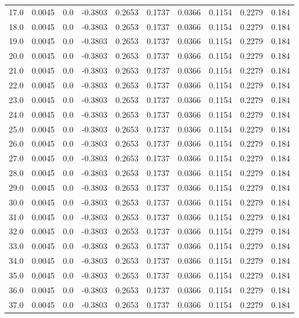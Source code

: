 \begin{longtable}{lrrrrrrrrr}
17.0 & 0.0045 & 0.0 & -0.3803 & 0.2653 & 0.1737 & 0.0366 & 0.1154 & 0.2279 & 0.184 \\
18.0 & 0.0045 & 0.0 & -0.3803 & 0.2653 & 0.1737 & 0.0366 & 0.1154 & 0.2279 & 0.184 \\
19.0 & 0.0045 & 0.0 & -0.3803 & 0.2653 & 0.1737 & 0.0366 & 0.1154 & 0.2279 & 0.184 \\
20.0 & 0.0045 & 0.0 & -0.3803 & 0.2653 & 0.1737 & 0.0366 & 0.1154 & 0.2279 & 0.184 \\
21.0 & 0.0045 & 0.0 & -0.3803 & 0.2653 & 0.1737 & 0.0366 & 0.1154 & 0.2279 & 0.184 \\
22.0 & 0.0045 & 0.0 & -0.3803 & 0.2653 & 0.1737 & 0.0366 & 0.1154 & 0.2279 & 0.184 \\
23.0 & 0.0045 & 0.0 & -0.3803 & 0.2653 & 0.1737 & 0.0366 & 0.1154 & 0.2279 & 0.184 \\
24.0 & 0.0045 & 0.0 & -0.3803 & 0.2653 & 0.1737 & 0.0366 & 0.1154 & 0.2279 & 0.184 \\
25.0 & 0.0045 & 0.0 & -0.3803 & 0.2653 & 0.1737 & 0.0366 & 0.1154 & 0.2279 & 0.184 \\
26.0 & 0.0045 & 0.0 & -0.3803 & 0.2653 & 0.1737 & 0.0366 & 0.1154 & 0.2279 & 0.184 \\
27.0 & 0.0045 & 0.0 & -0.3803 & 0.2653 & 0.1737 & 0.0366 & 0.1154 & 0.2279 & 0.184 \\
28.0 & 0.0045 & 0.0 & -0.3803 & 0.2653 & 0.1737 & 0.0366 & 0.1154 & 0.2279 & 0.184 \\
29.0 & 0.0045 & 0.0 & -0.3803 & 0.2653 & 0.1737 & 0.0366 & 0.1154 & 0.2279 & 0.184 \\
30.0 & 0.0045 & 0.0 & -0.3803 & 0.2653 & 0.1737 & 0.0366 & 0.1154 & 0.2279 & 0.184 \\
31.0 & 0.0045 & 0.0 & -0.3803 & 0.2653 & 0.1737 & 0.0366 & 0.1154 & 0.2279 & 0.184 \\
32.0 & 0.0045 & 0.0 & -0.3803 & 0.2653 & 0.1737 & 0.0366 & 0.1154 & 0.2279 & 0.184 \\
33.0 & 0.0045 & 0.0 & -0.3803 & 0.2653 & 0.1737 & 0.0366 & 0.1154 & 0.2279 & 0.184 \\
34.0 & 0.0045 & 0.0 & -0.3803 & 0.2653 & 0.1737 & 0.0366 & 0.1154 & 0.2279 & 0.184 \\
35.0 & 0.0045 & 0.0 & -0.3803 & 0.2653 & 0.1737 & 0.0366 & 0.1154 & 0.2279 & 0.184 \\
36.0 & 0.0045 & 0.0 & -0.3803 & 0.2653 & 0.1737 & 0.0366 & 0.1154 & 0.2279 & 0.184 \\
37.0 & 0.0045 & 0.0 & -0.3803 & 0.2653 & 0.1737 & 0.0366 & 0.1154 & 0.2279 & 0.184 \\

\end{longtable}
